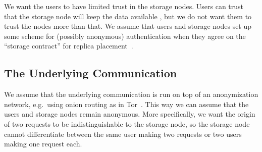 
We want the users to have limited trust in the storage nodes.
Users can trust that the storage node will keep the data available 
\cite{DataAvailability,ReplicaPlacement}, but we do not want them to trust the 
nodes more than that.
We assume that users and storage nodes set up some scheme for (possibly 
anonymous) authentication when they agree on the \enquote{storage contract} for 
replica placement~\cite{ReplicaPlacement}.

\subsection{The Underlying Communication}\label{sec:CommModel}


We assume that the underlying communication is run on top of an anonymization 
network, e.g.\ using onion routing as in Tor~\cite{Tor}.
This way we can assume that the users and storage nodes remain anonymous.
More specifically, we want the origin of two requests to be
indistinguishable to the storage node, so the storage node cannot differentiate 
between the same user making two requests or two users making one request each.

